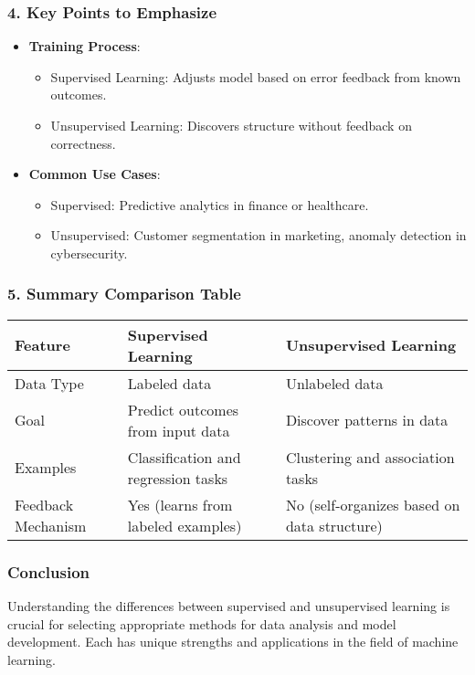 \documentclass[aspectratio=169]{beamer}
\begin{document}
\begin{frame}[fragile]
    \frametitle{4. Key Points to Emphasize}
    \begin{itemize}
        \item \textbf{Training Process}:
        \begin{itemize}
            \item Supervised Learning: Adjusts model based on error feedback from known outcomes.
            \item Unsupervised Learning: Discovers structure without feedback on correctness.
        \end{itemize}
        
        \item \textbf{Common Use Cases}:
        \begin{itemize}
            \item Supervised: Predictive analytics in finance or healthcare.
            \item Unsupervised: Customer segmentation in marketing, anomaly detection in cybersecurity.
        \end{itemize}
    \end{itemize}
\end{frame}

\begin{frame}[fragile]
    \frametitle{5. Summary Comparison Table}
    \begin{center}
    \begin{tabular}{|l|l|l|}
    \hline
    \textbf{Feature} & \textbf{Supervised Learning} & \textbf{Unsupervised Learning} \\ \hline
    Data Type & Labeled data & Unlabeled data \\ \hline
    Goal & Predict outcomes from input data & Discover patterns in data \\ \hline
    Examples & Classification and regression tasks & Clustering and association tasks \\ \hline
    Feedback Mechanism & Yes (learns from labeled examples) & No (self-organizes based on data structure) \\ \hline
    \end{tabular}
    \end{center}
\end{frame}

\begin{frame}[fragile]
    \frametitle{Conclusion}
    Understanding the differences between supervised and unsupervised learning is crucial for selecting appropriate methods for data analysis and model development. Each has unique strengths and applications in the field of machine learning.
\end{frame}
\end{document}
